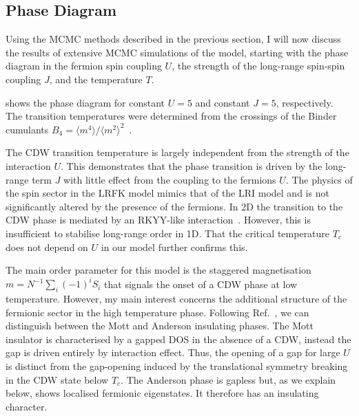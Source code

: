 \hypertarget{lrfk-results-phase-diagram}{%
\subsection{Phase Diagram}\label{lrfk-results-phase-diagram}}

Using the MCMC methods described in the previous section, I will now discuss the results of extensive MCMC simulations of the model, starting with the phase diagram in the fermion spin coupling \(U\), the strength of the long-range spin-spin coupling \(J\), and the temperature \(T\).

 shows the phase diagram for constant \(U=5\) and constant \(J=5\), respectively. The transition temperatures were determined from the crossings of the Binder cumulants \(B_4 = \langle m^4 \rangle /\langle m^2 \rangle^2\)~\autocite{binderFiniteSizeScaling1981}.

The CDW transition temperature is largely independent from the strength of the interaction \(U\). This demonstrates that the phase transition is driven by the long-range term \(J\) with little effect from the coupling to the fermions \(U\). The physics of the spin sector in the LRFK model mimics that of the LRI model and is not significantly altered by the presence of the fermions. In 2D the transition to the CDW phase is mediated by an RKYY-like interaction~\autocite{rusinCalculationRKKYRange2017}. However, this is insufficient to stabilise long-range order in 1D. That the critical temperature \(T_c\) does not depend on \(U\) in our model further confirms this.

The main order parameter for this model is the staggered magnetisation \(m = N^{-1} \sum_i (-1)^i S_i\) that signals the onset of a CDW phase at low temperature. However, my main interest concerns the additional structure of the fermionic sector in the high temperature phase. Following Ref.~\autocite{antipovInteractionTunedAndersonMott2016}, we can distinguish between the Mott and Anderson insulating phases. The Mott insulator is characterised by a gapped DOS in the absence of a CDW, instead the gap is driven entirely by interaction effect. Thus, the opening of a gap for large \(U\) is distinct from the gap-opening induced by the translational symmetry breaking in the CDW state below \(T_c\). The Anderson phase is gapless but, as we explain below, shows localised fermionic eigenstates. It therefore has an insulating character.


